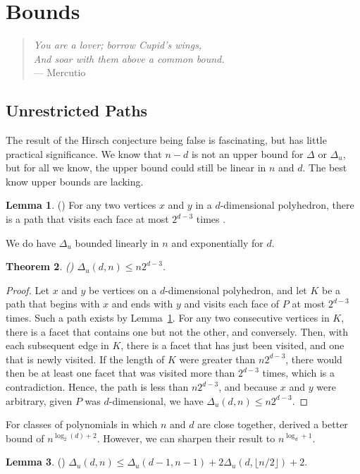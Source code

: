 \documentclass[11pt,a4paper]{article}
\newtheorem{thm}{Theorem}[section]
\theoremstyle{definition}
\newtheorem{lem}[thm]{Lemma}
\begin{document}
\section{Bounds}
\begin{quote}
	\emph{You are a lover; borrow Cupid's wings,}\\
	\emph{And soar with them above a common bound.}\\
	--- Mercutio \citep{romeo}
\end{quote}
\subsection{Unrestricted Paths}
The result of the Hirsch conjecture being false is fascinating, but has little practical significance. We know that $n-d$ is not an upper bound for $\Delta$ or $\Delta_u$, but for all we know, the upper bound could still be linear in $n$ and $d$. The best know upper bounds are lacking.
\begin{lem}\label{lem-lar}
(\citet{lar70}) For any two vertices $x$ and $y$ in a $d$-dimensional polyhedron, there is a path that visits each face at most $2^{d-3}$ times .
\end{lem}
We do have $\Delta_u$ bounded linearly in $n$ and exponentially for $d$.
\begin{thm}
{\rm(\citet{lar70})} $\Delta_u(d,n)\le n2^{d-3}$.
\end{thm}
\begin{proof}
Let $x$ and $y$ be vertices on a $d$-dimensional polyhedron, and let $K$ be a path that begins with $x$ and ends with $y$ and visits each face of $P$ at most $2^{d-3}$ times. Such a path exists by Lemma~\ref{lem-lar}. For any two consecutive vertices in $K$, there is a facet that contains one but not the other, and conversely. Then, with each subsequent edge in $K$, there is a facet that has just been visited, and one that is newly visited. If the length of $K$ were greater than $n2^{d-3}$, there would then be at least one facet that was visited more than $2^{d-3}$ times, which is a contradiction. Hence, the path is less than $n2^{d-3}$, and because $x$ and $y$ were arbitrary, given $P$ was $d$-dimensional, we have $\Delta_u(d,n)\le n2^{d-3}$.
\end{proof}
For classes of polynomials in which $n$ and $d$ are close together, \citet{kalai92c} derived a better bound of $n^{\log_2(d)+2}$. However, we can sharpen their result to $n^{\log_{d}+1}$. 
\begin{lem}
\rm{(\citet{kalai92c})} $\Delta_u(d,n)\le\Delta_u(d-1,n-1)+2\Delta_u(d,\lfloor n/2\rfloor)+2$.
\end{lem}
\end{document}

